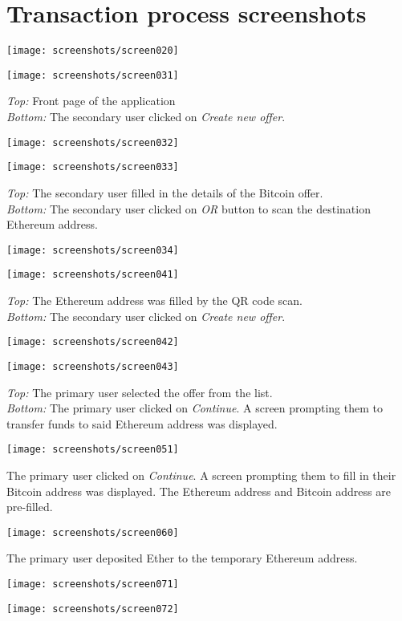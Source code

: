 \section{Transaction process screenshots}\label{sec:appendix-screenshots}


    \centerline{\texttt{[image: screenshots/screen020]}}
    \centerline{\texttt{[image: screenshots/screen031]}}
    \textit{Top:}    Front page of the application\\
    \textit{Bottom:} The secondary user clicked on \textit{Create new offer}.\\
    \centerline{\texttt{[image: screenshots/screen032]}}
    \centerline{\texttt{[image: screenshots/screen033]}}
    \textit{Top:}    The secondary user filled in the details of the Bitcoin offer.\\
    \textit{Bottom:} The secondary user clicked on \textit{OR} button to scan the destination Ethereum address.\\
    \centerline{\texttt{[image: screenshots/screen034]}}
    \centerline{\texttt{[image: screenshots/screen041]}}
    \textit{Top:}    The Ethereum address was filled by the QR code scan.\\
    \textit{Bottom:} The secondary user clicked on \textit{Create new offer}.\\
    \centerline{\texttt{[image: screenshots/screen042]}}
    \centerline{\texttt{[image: screenshots/screen043]}}
    \textit{Top:}    The primary user selected the offer from the list.\\
    \textit{Bottom:} The primary user clicked on \textit{Continue}. A screen prompting them to transfer funds to said Ethereum address was displayed.\\
    \centerline{\texttt{[image: screenshots/screen051]}}
    The primary user clicked on \textit{Continue}. A screen prompting them to fill in their Bitcoin address was displayed. The Ethereum address and Bitcoin address are pre-filled.\\
    \centerline{\texttt{[image: screenshots/screen060]}}
    The primary user deposited Ether to the temporary Ethereum address.\\
    \centerline{\texttt{[image: screenshots/screen071]}}
    \centerline{\texttt{[image: screenshots/screen072]}}
